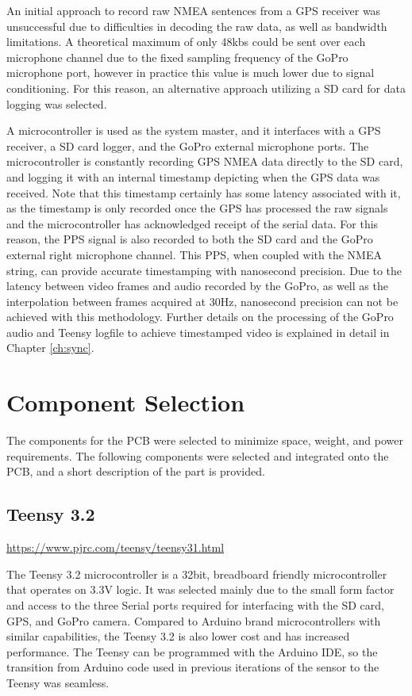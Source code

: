 An initial approach to record raw NMEA sentences from a GPS receiver was unsuccessful due to difficulties in decoding the raw data, as well as bandwidth limitations.  A theoretical maximum of only 48kbs could be sent over each microphone channel due to the fixed sampling frequency of the GoPro microphone port, however in practice this value is much lower due to signal conditioning.  For this reason, an alternative approach utilizing a SD card for data logging was selected. 

A microcontroller is used as the system master, and it interfaces with a GPS receiver, a SD card logger, and the GoPro external microphone ports.  The microcontroller is constantly recording GPS NMEA data directly to the SD card, and logging it with an internal timestamp depicting when the GPS data was received.  Note that this timestamp certainly has some latency associated with it, as the timestamp is only recorded once the GPS has processed the raw signals and the microcontroller has acknowledged receipt of the serial data.  For this reason, the PPS signal is also recorded to both the SD card and the GoPro external right microphone channel.  This PPS, when coupled with the NMEA string, can provide accurate timestamping with nanosecond precision.  Due to the latency between video frames and audio recorded by the GoPro, as well as the interpolation between frames acquired at 30Hz, nanosecond precision can not be achieved with this methodology.  Further details on the processing of the GoPro audio and Teensy logfile to achieve timestamped video is explained in detail in Chapter \ref{ch:sync}.

\section{Component Selection}
The components for the PCB were selected to minimize space, weight, and power requirements.  The following components were selected and integrated onto the PCB, and a short description of the part is provided.
\subsection{Teensy 3.2}

\url{https://www.pjrc.com/teensy/teensy31.html}\vspace{0.5em}

The Teensy 3.2 microcontroller is a 32bit, breadboard friendly microcontroller that operates on 3.3V logic.  It was selected mainly due to the small form factor and access to the three Serial ports required for interfacing with the SD card, GPS, and GoPro camera.  Compared to Arduino brand microcontrollers with similar capabilities, the Teensy 3.2 is also lower cost and has increased performance.  The Teensy can be programmed with the Arduino IDE, so the transition from Arduino code used in previous iterations of the sensor to the Teensy was seamless.  
